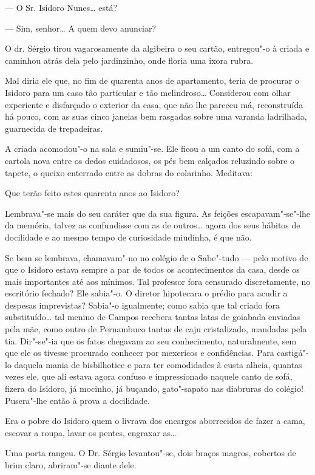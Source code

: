 --- O Sr. Isidoro Nunes\ldots{} está?

--- Sim, senhor\ldots{} A quem devo anunciar?

O dr. Sérgio tirou vagarosamente da algibeira o seu cartão, entregou"-o à
criada e caminhou atrás dela pelo jardinzinho, onde floria uma ixora
rubra.

Mal diria ele que, no fim de quarenta anos de apartamento, teria de
procurar o Isidoro para um caso tão particular e tão melindroso\ldots{}
Considerou com olhar experiente e disfarçado o exterior da casa, que não
lhe pareceu má, reconstruída há pouco, com as suas cinco janelas bem
rasgadas sobre uma varanda ladrilhada, guarnecida de trepadeiras.

A criada acomodou"-o na sala e sumiu"-se. Ele ficou a um canto do sofá,
com a cartola nova entre os dedos cuidadosos, os pés bem calçados
reluzindo sobre o tapete, o queixo enterrado entre as dobras do
colarinho. Meditava:

Que terão feito estes quarenta anos ao Isidoro?

Lembrava"-se mais do seu caráter que da sua figura. As feições
escapavam"-se"-lhe da memória, talvez as confundisse com as de outros\ldots{}
agora dos seus hábitos de docilidade e ao mesmo tempo de curiosidade
miudinha, é que não.

Se bem se lembrava, chamavam"-no no colégio de o Sabe"-tudo --- pelo
motivo de que o Isidoro estava sempre a par de todos os acontecimentos
da casa, desde os mais importantes até aos mínimos. Tal professor fora
censurado discretamente, no escritório fechado? Ele sabia"-o. O diretor
hipotecara o prédio para acudir a despesas imprevistas? Sabia"-o
igualmente; como sabia que tal criado fora substituído\ldots{} tal menino de
Campos recebera tantas latas de goiabada enviadas pela mãe, como outro
de Pernambuco tantas de caju cristalizado, mandadas pela tia. Dir"-se"-ia
que os fatos chegavam ao seu conhecimento, naturalmente, sem que ele os
tivesse procurado conhecer por mexericos e confidências. Para castigá"-lo
daquela mania de bisbilhotice e para ter comodidades à custa alheia,
quantas vezes ele, que ali estava agora confuso e impressionado naquele
canto de sofá, fizera do Isidoro, já mocinho, já buçando, gato"-sapato
nas diabruras do colégio! Pusera"-lhe então à prova a docilidade.

Era o pobre do Isidoro quem o livrava dos encargos aborrecidos de fazer
a cama, escovar a roupa, lavar os pentes, engraxar as\ldots{}

Uma porta rangeu. O Dr. Sérgio levantou"-se, dois braços magros, cobertos
de brim claro, abriram"-se diante dele.


